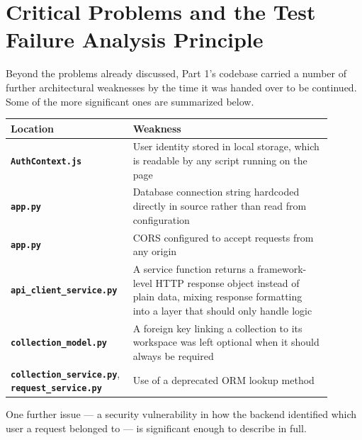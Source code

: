 \section{Critical Problems and the Test Failure Analysis Principle}

\raggedbottom
Beyond the problems already discussed, Part 1's codebase carried a number of further architectural weaknesses by the time it was handed over to be continued. Some of the more significant ones are summarized below.

\begin{center}
\renewcommand{\arraystretch}{1.3}
\begin{tabular}{p{0.30\linewidth} p{0.60\linewidth}}
\toprule
\textbf{Location} & \textbf{Weakness} \\
\midrule
\textbf{\texttt{AuthContext.js}} & User identity stored in local storage, which is readable by any script running on the page \\
\textbf{\texttt{app.py}} & Database connection string hardcoded directly in source rather than read from configuration \\
\textbf{\texttt{app.py}} & CORS configured to accept requests from any origin \\
\textbf{\texttt{api\_client\_service.py}} & A service function returns a framework-level HTTP response object instead of plain data, mixing response formatting into a layer that should only handle logic \\
\textbf{\texttt{collection\_model.py}} & A foreign key linking a collection to its workspace was left optional when it should always be required \\
\textbf{\texttt{collection\_service.py}}, \textbf{\texttt{request\_service.py}} & Use of a deprecated ORM lookup method \\
\bottomrule
\end{tabular}
\end{center}

One further issue --- a security vulnerability in how the backend identified which user a request belonged to --- is significant enough to describe in full.

